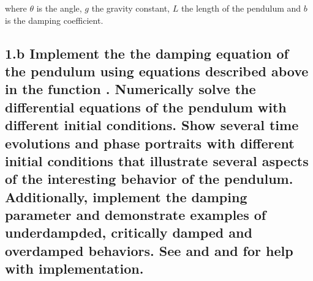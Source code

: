 \documentclass{cmc}
\begin{document}
where $\theta$ is the angle, $g$ the gravity constant, $L$ the length of the pendulum
and $b$ is the damping coefficient.








\subsection*{1.b Implement the the damping equation of the pendulum using equations described above in the function
  . Numerically solve the differential equations of the pendulum
  with different initial conditions.  Show several time evolutions and phase
  portraits with different initial conditions that illustrate several aspects of
  the interesting behavior of the pendulum. Additionally, implement the damping parameter and demonstrate examples of underdampded, critically damped and overdamped behaviors.
  See  and  and
   for help with implementation.}
\end{document}
